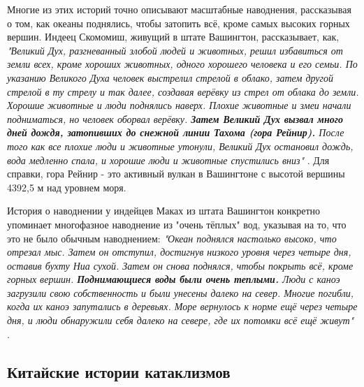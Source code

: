 \documentclass[10pt,twocolumn,letterpaper]{article}
\begin{document}
Многие из этих историй точно описывают масштабные наводнения, рассказывая о том, как океаны поднялись, чтобы затопить всё, кроме самых высоких горных вершин. Индеец Скомомиш, живущий в штате Вашингтон, рассказывает, как, \textit{"Великий Дух, разгневанный злобой людей и животных, решил избавиться от земли всех, кроме хороших животных, одного хорошего человека и его семьи. По указанию Великого Духа человек выстрелил стрелой в облако, затем другой стрелой в ту стрелу и так далее, создавая верёвку из стрел от облака до земли. Хорошие животные и люди поднялись наверх. Плохие животные и змеи начали подниматься, но человек оборвал верёвку. \textbf{Затем Великий Дух вызвал много дней дождя, затопивших до снежной линии Тахома (гора Рейнир).} После того как все плохие люди и животные утонули, Великий Дух остановил дождь, вода медленно спала, и хорошие люди и животные спустились вниз"} \cite{3}. Для справки, гора Рейнир - это активный вулкан в Вашингтоне с высотой вершины 4392,5 м над уровнем моря.

История о наводнении у индейцев Маках из штата Вашингтон конкретно упоминает многофазное наводнение из "очень тёплых" вод, указывая на то, что это не было обычным наводнением: \textit{"Океан поднялся настолько высоко, что отрезал мыс. Затем он отступил, достигнув низкого уровня через четыре дня, оставив бухту Ниа сухой. Затем он снова поднялся, чтобы покрыть всё, кроме горных вершин. \textbf{Поднимающиеся воды были очень теплыми.} Люди с каноэ загрузили свою собственность и были унесены далеко на север. Многие погибли, когда их каноэ запутались в деревьях. Море вернулось к норме ещё через четыре дня, и люди обнаружили себя далеко на севере, где их потомки всё ещё живут"} \cite{3}.

\subsection{Китайские истории катаклизмов}
\end{document}
